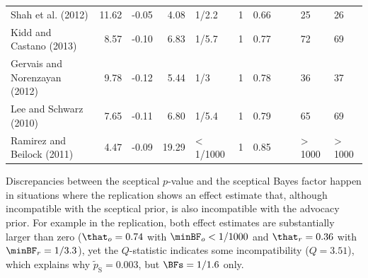 \begin{landscape}
\begin{table}[!htb]
{\begin{tabular}{lrrrlllllll}
  Shah et al. (2012) & 11.62 & -0.05 & 4.08 & 1/2.2 & 1 & 0.66 &  &  & 25 & 26 \\
  Kidd and Castano (2013) & 8.57 & -0.10 & 6.83 & 1/5.7 & 1 & 0.77 &  &  & 72 & 69 \\
  Gervais and Norenzayan (2012) & 9.78 & -0.12 & 5.44 & 1/3 & 1 & 0.78 &  &  & 36 & 37 \\
  Lee and Schwarz (2010) & 7.65 & -0.11 & 6.80 & 1/5.4 & 1 & 0.79 &  &  & 65 & 69 \\
  Ramirez and Beilock (2011) & 4.47 & -0.09 & 19.29 & < 1/1000 & 1 & 0.85 &  &  & > 1000 & > 1000 \\
   \bottomrule
\end{tabular}
}
\label{tab:ssrp}
\end{table}

\end{landscape}



Discrepancies between the sceptical $p$-value and the sceptical Bayes factor
happen in situations where the replication shows an effect estimate that,
although incompatible with the sceptical prior, is also incompatible with the
advocacy prior. For example in the \citet{Janssen2010} replication, both effect
estimates are substantially larger than zero ($\that_o = 0.74$ with
$\minBF_{o} < 1/1000$ and $\that_r = 0.36$ with $\minBF_{r} = 1/3.3$), yet the
$Q$-statistic indicates some incompatibility ($Q = 3.51$), which explains why
$\tilde{p}_{\mathrm{S}} = 0.003$, but $\BFs = 1/1.6$ only.

